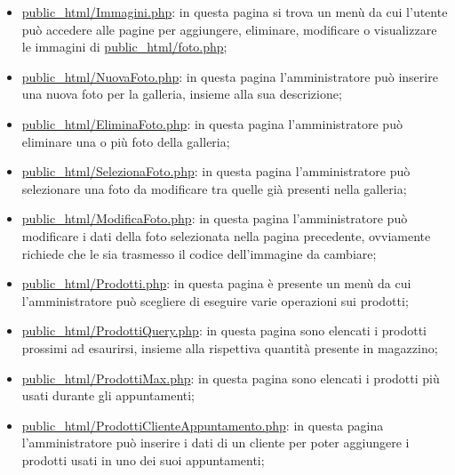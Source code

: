 {\begin{itemize}
		\item \href{http://tecnologie-web.studenti.math.unipd.it/tecweb/~pgabelli/public\_html/Immagini.php}{public\_html/Immagini.php}: in questa pagina si trova un menù da cui l'utente può accedere alle pagine per aggiungere, eliminare, modificare o visualizzare le immagini di \href{http://tecnologie-web.studenti.math.unipd.it/tecweb/~pgabelli/public\_html/foto.php}{public\_html/foto.php};
		\item \href{http://tecnologie-web.studenti.math.unipd.it/tecweb/~pgabelli/public\_html/NuovaFoto.php}{public\_html/NuovaFoto.php}: in questa pagina l'amministratore può inserire una nuova foto per la galleria, insieme alla sua descrizione;
		\item \href{http://tecnologie-web.studenti.math.unipd.it/tecweb/~pgabelli/public\_html/EliminaFoto.php}{public\_html/EliminaFoto.php}: in questa pagina l'amministratore può eliminare una o più foto della galleria;
		\item \href{http://tecnologie-web.studenti.math.unipd.it/tecweb/~pgabelli/public\_html/SelezionaFoto.php}{public\_html/SelezionaFoto.php}: in questa pagina l'amministratore può selezionare una foto da modificare tra quelle già presenti nella galleria;
		\item \underline{public\_html/ModificaFoto.php}: in questa pagina l'amministratore può modificare i dati della foto selezionata nella pagina precedente, ovviamente richiede che le sia trasmesso il codice dell'immagine da cambiare;
		\item \href{http://tecnologie-web.studenti.math.unipd.it/tecweb/~pgabelli/public\_html/Prodotti.php}{public\_html/Prodotti.php}: in questa pagina è presente un menù da cui l'amministratore può scegliere di eseguire varie operazioni sui prodotti;
		\item \href{http://tecnologie-web.studenti.math.unipd.it/tecweb/~pgabelli/public\_html/ProdottiQuery.php}{public\_html/ProdottiQuery.php}: in questa pagina sono elencati i prodotti prossimi ad esaurirsi, insieme alla rispettiva quantità presente in magazzino;
		\item \href{http://tecnologie-web.studenti.math.unipd.it/tecweb/~pgabelli/public\_html/ProdottiMax.php}{public\_html/ProdottiMax.php}: in questa pagina sono elencati i prodotti più usati durante gli appuntamenti;
		\item \href{http://tecnologie-web.studenti.math.unipd.it/tecweb/~pgabelli/public\_html/ProdottiClienteAppuntamento.php}{public\_html/ProdottiClienteAppuntamento.php}: in questa pagina l'amministratore può inserire i dati di un cliente per poter aggiungere i prodotti usati in uno dei suoi appuntamenti;

\end{itemize}}
